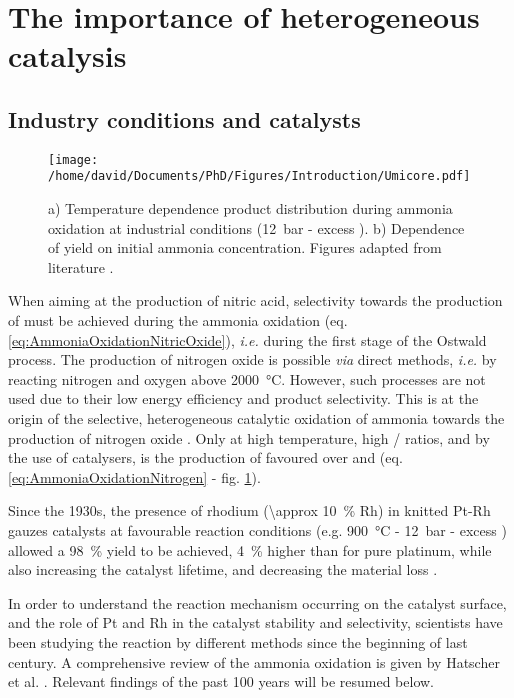 \section{The importance of heterogeneous catalysis}\label{sec:AmoOxiHC}

\subsection{Industry conditions and catalysts}

\begin{figure}[!htb]
    \centering
    \texttt{[image: /home/david/Documents/PhD/Figures/Introduction/Umicore.pdf]}
    \caption{
    a) Temperature dependence product distribution during ammonia oxidation at industrial conditions (\qty{12}{\bar} - excess ).
    b) Dependence of  yield on initial ammonia concentration.
    Figures adapted from literature \parencite{Heck1982, Hatscher2008}.
    }
    \label{fig:Products}
\end{figure}

When aiming at the production of nitric acid, selectivity towards the production of  must be achieved during the ammonia oxidation (eq. \ref{eq:AmmoniaOxidationNitricOxide}), \textit{i.e.} during the first stage of the Ostwald process.
The production of nitrogen oxide is possible \textit{via} direct methods, \textit{i.e.} by reacting nitrogen and oxygen above \qty{2000}{\degreeCelsius}.
However, such processes are not used due to their low energy efficiency and product selectivity.
This is at the origin of the selective, heterogeneous catalytic oxidation of ammonia towards the production of nitrogen oxide \parencite{Hatscher2008}.
Only at high temperature, high / ratios, and by the use of catalysers, is the production of  favoured over  and  (eq. \ref{eq:AmmoniaOxidationNitrogen} - fig. \ref{fig:Products}).

Since the 1930s, the presence of rhodium (\qty{\approx 10}{\percent} Rh) in knitted Pt-Rh gauzes catalysts at favourable reaction conditions (e.g. \qty{900}{\degreeCelsius} - \qty{12}{\bar} - excess ) allowed a \qty{98}{\percent}  yield to be achieved, \qty{4}{\percent} higher than for pure platinum, while also increasing the catalyst lifetime, and decreasing the material loss \parencite{Kaiser1909, Handforth1934, Heck1982, Hatscher2008}.

In order to understand the reaction mechanism occurring on the catalyst surface, and the role of Pt and Rh in the catalyst stability and selectivity, scientists have been studying the reaction by different methods since the beginning of last century.
A comprehensive review of the ammonia oxidation is given by Hatscher et al. \parencite*{Hatscher2008}.
Relevant findings of the past 100 years will be resumed below.

